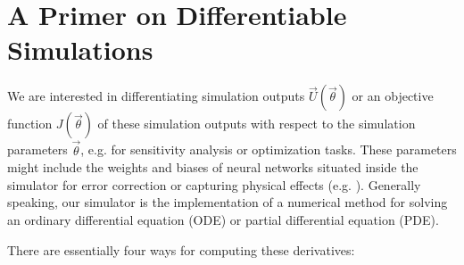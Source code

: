 \section{A Primer on Differentiable Simulations}
\label{sec:diff_sim}
\thispagestyle{plain}

We are interested in differentiating simulation outputs $\vec{U}(\vec{\theta})$ or an objective function
$J(\vec{\theta})$ of these simulation outputs with respect to the simulation parameters $\vec{\theta}$, e.g. for sensitivity
analysis or optimization tasks. These parameters might include the weights and biases of
neural networks situated inside the simulator for error correction \citep{um21} or capturing
physical effects (e.g. \cite{wang23}). Generally speaking, our simulator is the implementation
of a numerical method for solving an ordinary differential equation (ODE) 
or partial differential equation (PDE).

There are essentially four ways for computing these derivatives:

